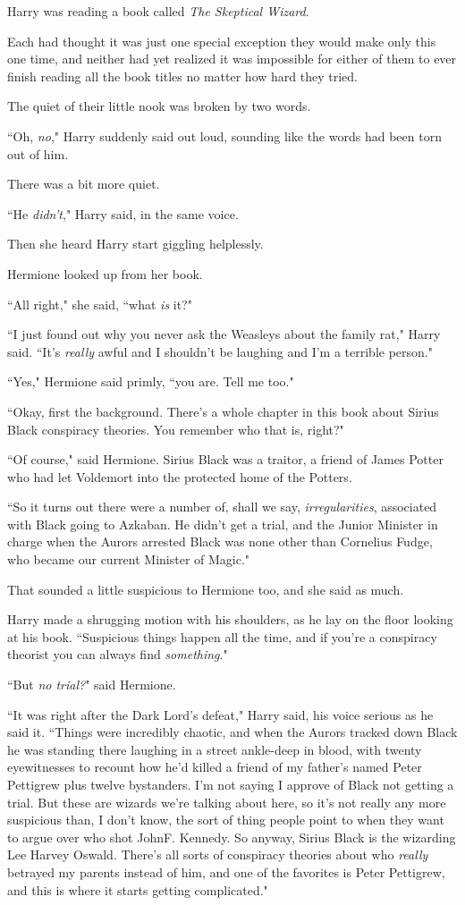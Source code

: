 Harry was reading a book called \emph{The Skeptical Wizard}.

Each had thought it was just one special exception they would make only this one time, and neither had yet realized it was impossible for either of them to ever finish reading all the book titles no matter how hard they tried.

The quiet of their little nook was broken by two words.

``Oh, \emph{no}," Harry suddenly said out loud, sounding like the words had been torn out of him.

There was a bit more quiet.

``He \emph{didn't}," Harry said, in the same voice.

Then she heard Harry start giggling helplessly.

Hermione looked up from her book.

``All right," she said, ``what \emph{is} it?"

``I just found out why you never ask the Weasleys about the family rat," Harry said. ``It's \emph{really} awful and I shouldn't be laughing and I'm a terrible person."

``Yes," Hermione said primly, ``you are. Tell me too."

``Okay, first the background. There's a whole chapter in this book about Sirius Black conspiracy theories. You remember who that is, right?"

``Of course," said Hermione. Sirius Black was a traitor, a friend of James Potter who had let Voldemort into the protected home of the Potters.

``So it turns out there were a number of, shall we say, \emph{irregularities}, associated with Black going to Azkaban. He didn't get a trial, and the Junior Minister in charge when the Aurors arrested Black was none other than Cornelius Fudge, who became our current Minister of Magic."

That sounded a little suspicious to Hermione too, and she said as much.

Harry made a shrugging motion with his shoulders, as he lay on the floor looking at his book. ``Suspicious things happen all the time, and if you're a conspiracy theorist you can always find \emph{something}."

``But \emph{no trial?}" said Hermione.

``It was right after the Dark Lord's defeat," Harry said, his voice serious as he said it. ``Things were incredibly chaotic, and when the Aurors tracked down Black he was standing there laughing in a street ankle-deep in blood, with twenty eyewitnesses to recount how he'd killed a friend of my father's named Peter Pettigrew plus twelve bystanders. I'm not saying I approve of Black not getting a trial. But these are wizards we're talking about here, so it's not really any more suspicious than, I don't know, the sort of thing people point to when they want to argue over who shot John\?F. Kennedy. So anyway, Sirius Black is the wizarding Lee Harvey Oswald. There's all sorts of conspiracy theories about who \emph{really} betrayed my parents instead of him, and one of the favorites is Peter Pettigrew, and this is where it starts getting complicated."

